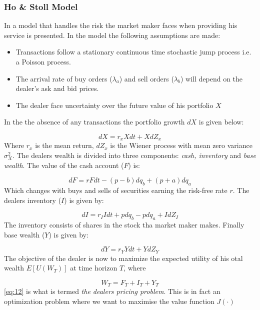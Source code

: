 \documentclass{kththesis}
\theoremstyle{definition}
\begin{document}
\subsubsection*{Ho \& Stoll Model}
In \textcite{ho1981optimal} a model that handles the risk the market maker faces when providing his service is presented. In the model the following assumptions are made:

\begin{itemize}
    \item Transactions follow a stationary continuous time stochastic jump process i.e. a Poisson process. 
    
    \item The arrival rate of buy orders ($\lambda_a$) and sell orders ($\lambda_b$) will depend on the dealer's ask and bid prices.
    
    \item The dealer face uncertainty over the future value of his portfolio $X$
\end{itemize}
In the the absence of any transactions the portfolio growth $dX$ is given below:

\begin{equation}
    \label{eq:8}
    dX = r_{x}Xdt + XdZ_x
\end{equation}
Where $r_x$ is the mean return, $dZ_x$ is the Wiener process with mean zero variance $\sigma^{2}_X$. The dealers wealth is divided into three components: \textit{cash, inventory} and \textit{base wealth}. The value of the cash account ($F$) is:

\begin{equation}
    \label{eq:9}
    dF = rFdt- (p-b)dq_b + (p+a)dq_a
\end{equation}
Which changes with buys and sells of securities earning the risk-free rate $r$. The dealers inventory ($I$) is given by:

\begin{equation}
    \label{eq:10}
    dI = r_{I}Idt+pdq_{b} - pdq_{a} + IdZ_{I}
\end{equation}
The inventory consists of shares in the stock tha market maker makes.
Finally base wealth ($Y$) is given by:

\begin{equation}
    \label{eq:11}
    dY = r_{Y}Ydt+YdZ_{Y} 
\end{equation}
The objective of the dealer is now to maximize the expected utility of his otal wealth $E[U(W_T)]$ at time horizon $T$, where 

\begin{equation}
    \label{eq:12}
    W_{T} = F_{T} + I_{T} + Y_{T}
\end{equation}
\autoref{eq:12} is what is termed \textit{the dealers pricing problem}. This is in fact an optimization problem where we want to maximise the value function $J(\cdot)$
\end{document}
